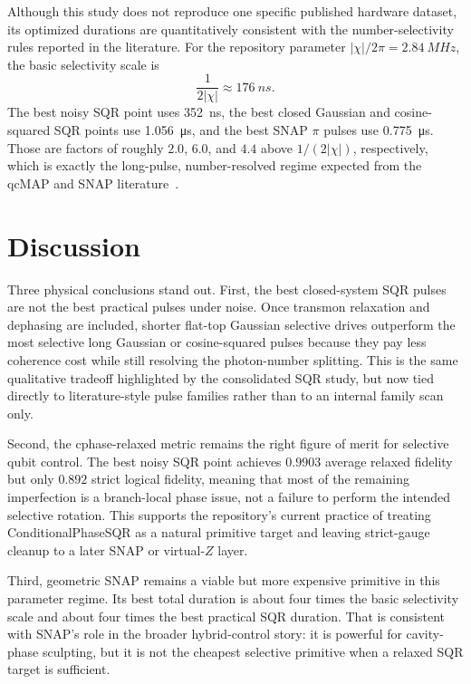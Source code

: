 \documentclass[aps,pra,twocolumn,reprint,amsmath,amssymb]{revtex4-2}
\begin{document}
Although this study does not reproduce one specific published hardware dataset, its optimized durations are quantitatively consistent with the number-selectivity rules reported in the literature. For the repository parameter $|\chi|/2\pi=\SI{2.84}{MHz}$, the basic selectivity scale is
\begin{equation}
\frac{1}{2|\chi|} \approx \SI{176}{ns}.
\end{equation}
The best noisy SQR point uses \SI{352}{ns}, the best closed Gaussian and cosine-squared SQR points use \SI{1.056}{\micro s}, and the best SNAP $\pi$ pulses use \SI{0.775}{\micro s}. Those are factors of roughly $2.0$, $6.0$, and $4.4$ above $1/(2|\chi|)$, respectively, which is exactly the long-pulse, number-resolved regime expected from the qcMAP and SNAP literature~\cite{leghtas2013qcmap,heeres2015snap,degraaf2025dualrail}.

\section{Discussion}

Three physical conclusions stand out. First, the best closed-system SQR pulses are not the best practical pulses under noise. Once transmon relaxation and dephasing are included, shorter flat-top Gaussian selective drives outperform the most selective long Gaussian or cosine-squared pulses because they pay less coherence cost while still resolving the photon-number splitting. This is the same qualitative tradeoff highlighted by the consolidated SQR study, but now tied directly to literature-style pulse families rather than to an internal family scan only.

Second, the cphase-relaxed metric remains the right figure of merit for selective qubit control. The best noisy SQR point achieves $0.9903$ average relaxed fidelity but only $0.892$ strict logical fidelity, meaning that most of the remaining imperfection is a branch-local phase issue, not a failure to perform the intended selective rotation. This supports the repository's current practice of treating ConditionalPhaseSQR as a natural primitive target and leaving strict-gauge cleanup to a later SNAP or virtual-$Z$ layer.

Third, geometric SNAP remains a viable but more expensive primitive in this parameter regime. Its best total duration is about four times the basic selectivity scale and about four times the best practical SQR duration. That is consistent with SNAP's role in the broader hybrid-control story: it is powerful for cavity-phase sculpting, but it is not the cheapest selective primitive when a relaxed SQR target is sufficient.
\end{document}
